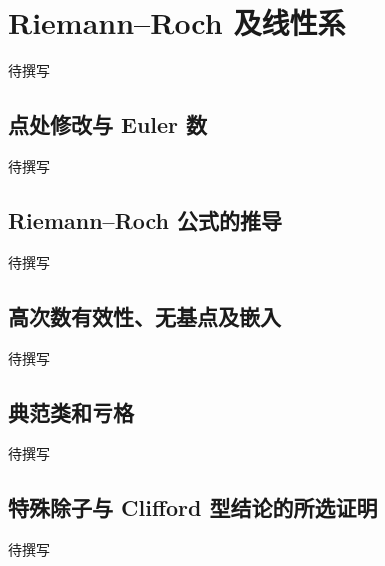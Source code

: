 
% 
% 
% 

\section{Riemann–Roch 及线性系}
\label{g5:sec:2305}

待撰写

\subsection{点处修改与 Euler 数}
\label{g5:subsec:2305:01}
待撰写

\subsection{Riemann–Roch 公式的推导}
\label{g5:subsec:2305:02}
待撰写

\subsection{高次数有效性、无基点及嵌入}
\label{g5:subsec:2305:03}
待撰写

\subsection{典范类和亏格}
\label{g5:subsec:2305:04}
待撰写

\subsection{特殊除子与 Clifford 型结论的所选证明}
\label{g5:subsec:2305:05}
待撰写
